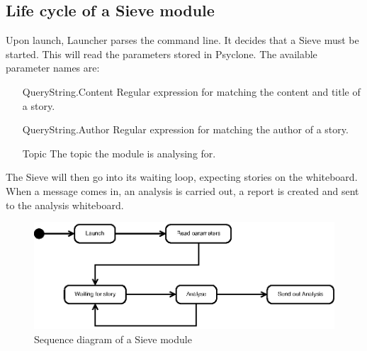 \subsection{Life cycle of a Sieve module}

Upon launch, Launcher parses the command line. It decides that a Sieve must
be started. This will read the parameters stored in Psyclone. The available parameter names are:

\begin{itemize}
 \item[QueryString.Content] Regular expression for matching the content and title of a story.
 \item[QueryString.Author] Regular expression for matching the author of a story.
 \item[Topic] The topic the module is analysing for.
\end{itemize}

The Sieve will then go into its waiting loop, expecting stories on the
whiteboard. When a message comes in, an analysis is carried out, a report is
created and sent to the analysis whiteboard.

\begin{figure}[htp]
  \centering
  \includegraphics{image/sequence-diagram-sieve}
  \caption{Sequence diagram of a Sieve module}
\end{figure}
